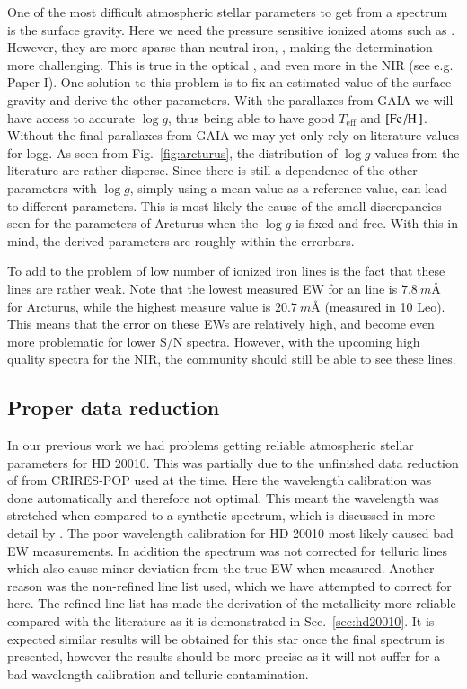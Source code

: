 \documentclass{aa}
\begin{document}
One of the most difficult atmospheric stellar parameters to get from a spectrum
is the surface gravity. Here we need the pressure sensitive ionized atoms such
as . However, they are more sparse than neutral iron, ,
making the determination more challenging. This is true in the optical
\citep[see e.g. the discussion by][]{Mortier2013c}, and even more in the NIR
(see e.g. Paper I). One solution to this problem is to fix an estimated value of
the surface gravity and derive the other parameters. With the parallaxes from
GAIA \citep{GAIA} we will have access to accurate $\log g$, thus being able to
have good $T_\mathrm{eff}$ and $[\ion{Fe}/\ion{H}]$. Without the final
parallaxes from GAIA we may yet only rely on literature values for logg. As seen
from Fig.~\ref{fig:arcturus}, the distribution of $\log g$ values from the
literature are rather disperse. Since there is still a dependence of the other
parameters with $\log g$, simply using a mean value as a reference value, can
lead to different parameters. This is most likely the cause of the small
discrepancies seen for the parameters of Arcturus when the $\log g$ is fixed and
free. With this in mind, the derived parameters are roughly within the
errorbars.

To add to the problem of low number of ionized iron lines is the fact that these
lines are rather weak. Note that the lowest measured EW for an  line
is $\SI{7.8}{m}$\AA{} for Arcturus, while the highest measure value is
$\SI{20.7}{m}$\AA{} (measured in 10 Leo). This means that the error on these EWs
are relatively high, and become even more problematic for lower S/N spectra.
However, with the upcoming high quality spectra for the NIR, the community
should still be able to see these  lines.


\subsection{Proper data reduction}

In our previous work we had problems getting reliable atmospheric stellar
parameters for HD 20010. This was partially due to the unfinished data reduction
of from CRIRES-POP used at the time. Here the wavelength calibration was done
automatically and therefore not optimal. This meant the wavelength was stretched
when compared to a synthetic spectrum, which is discussed in more detail by
\citet{Nicholls2016}. The poor wavelength calibration for HD 20010 most likely
caused bad EW measurements. In addition the spectrum was not corrected for
telluric lines which also cause minor deviation from the true EW when measured.
Another reason was the non-refined line list used, which we have attempted to
correct for here. The refined line list has made the derivation of the
metallicity more reliable compared with the literature as it is demonstrated in
Sec.~\ref{sec:hd20010}. It is expected similar results will be obtained for this
star once the final spectrum is presented, however the results should be more
precise as it will not suffer for a bad wavelength calibration and telluric
contamination.
\end{document}
